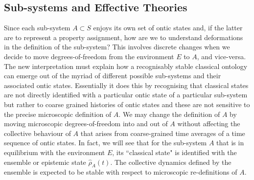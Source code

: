 \documentclass[%
preprint,
nofootinbib,
 amsmath,amssymb,
aps,
]{revtex4-1}
\def\BS{S}
\def\BA{A}
\begin{document}
\subsection{Sub-systems and Effective Theories}\label{s1.2}

Since each sub-system $\BA\subset\BS$ enjoys its own set of ontic states and, if the latter are to represent a property assignment, how are we to understand deformations in the definition of the sub-system? This involves discrete changes when we decide to move degrees-of-freedom from the environment $E$ to $\BA$, and vice-versa. The new interpretation  must explain how a recognisably stable classical ontology can emerge out of the myriad of different possible sub-systems and their associated ontic states. 
Essentially it does this by recognising that classical states are not 
directly identified with a particular ontic state of a particular sub-system but rather to coarse grained histories of ontic states and these are not sensitive to the precise microscopic definition of $\BA$. We may change the definition of $A$ by moving microscopic degrees-of-freedom into and out of $A$ without affecting the collective behaviour of $A$ that arises from coarse-grained time averages of a time sequence of ontic states. In fact, we will see that for the sub-system $A$ that is in equilibrium with the environment $E$, its ``classical state" is identified with the ensemble or epistemic state $\hat\rho_A(t)$. The collective dynamics defined by the ensemble is expected to be stable with respect to microscopic re-definitions of $A$.
\end{document}
